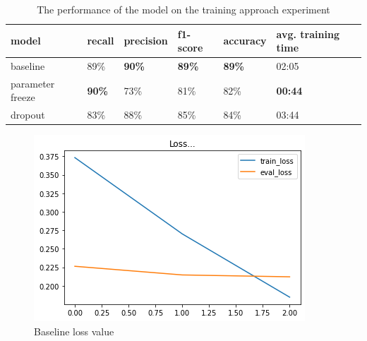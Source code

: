 \begin{table}[h]
  \centering
  \caption{The performance of the model on the training approach experiment}
  \label{tab: model_training_result}
  \begin{tabular}{|p{.12\linewidth}|l|l|l|l|p{.12\linewidth}|}
    \hline
    \textbf{model}   & \textbf{recall} & \textbf{precision} & \textbf{f1-score} & \textbf{accuracy} & \textbf{avg. training time} \\ \hline
    baseline         & 89\%            & \textbf{90\%}      & \textbf{89\%}     & \textbf{89\%}     & 02:05                       \\ \hline
    parameter freeze & \textbf{90\%}   & 73\%               & 81\%              & 82\%              & \textbf{00:44}              \\ \hline
    dropout          & 83\%            & 88\%               & 85\%              & 84\%              & 03:44                       \\ \hline
  \end{tabular}
\end{table}

\begin{figure}[h]
  \begin{center}
    \includegraphics[width= 0.9\linewidth]{gambar/loss_concat_awal.png}
    \caption{Baseline loss value}
    \label{fig: loss_baseline}
  \end{center}
\end{figure}

